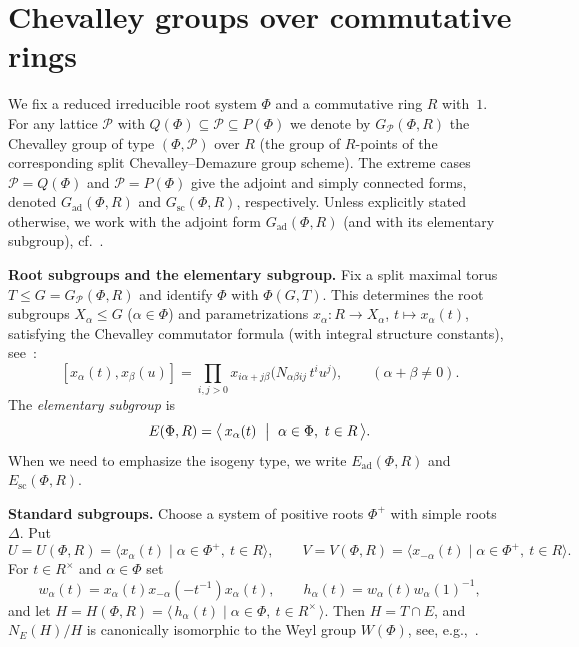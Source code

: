 \documentclass[]{jgcc}
\numberwithin{equation}{section}
\begin{document}
\bigskip

\section{Chevalley groups over commutative rings}\leavevmode\label{sec:Chev}

We fix a reduced irreducible root system $\Phi$ and a commutative ring $R$ with~$1$.
For any lattice $\mathcal P$ with $Q(\Phi)\subseteq \mathcal P \subseteq P(\Phi)$ we denote by
$G_{\mathcal P}(\Phi,R)$ the Chevalley group of type $(\Phi,\mathcal P)$ over $R$
(the group of $R$-points of the corresponding split Chevalley--Demazure group scheme).
The extreme cases $\mathcal P=Q(\Phi)$ and $\mathcal P=P(\Phi)$ give the adjoint and simply connected
forms, denoted $G_{\mathrm{ad}}(\Phi,R)$ and $G_{\mathrm{sc}}(\Phi,R)$, respectively.
Unless explicitly stated otherwise, we work with the adjoint form $G_{\mathrm{ad}}(\Phi,R)$
(and with its elementary subgroup), cf.~\cite{Carter,Steinberg}.

\medskip
\noindent\textbf{Root subgroups and the elementary subgroup.}
Fix a split maximal torus $T\le G=G_{\mathcal P}(\Phi,R)$ and identify $\Phi$ with $\Phi(G,T)$.
This determines the root subgroups $X_\alpha\le G$ ($\alpha\in\Phi$) and parametrizations
$x_\alpha\colon R\to X_\alpha$, $t\mapsto x_\alpha(t)$, satisfying the Chevalley commutator formula
(with integral structure constants), see~\cite{Carter,Steinberg}:
\begin{equation}\label{eq:Chev-comm}
[x_\alpha(t),x_\beta(u)]
=\prod_{i,j>0} x_{i\alpha+j\beta}\!\bigl(N_{\alpha\beta ij}\,t^i u^j\bigr),
\qquad (\alpha+\beta\neq 0).
\end{equation}
The \emph{elementary subgroup} is
\[
E(\Phi,R)=\bigl\langle\,x_\alpha(t)\ \bigm|\ \alpha\in\Phi,\ t\in R\,\bigr\rangle.
\]
When we need to emphasize the isogeny type, we write $E_{\mathrm{ad}}(\Phi,R)$ and $E_{\mathrm{sc}}(\Phi,R)$.

\medskip
\noindent\textbf{Standard subgroups.}
Choose a system of positive roots $\Phi^+$ with simple roots $\Delta$.
Put
\[
U=U(\Phi,R)=\langle x_\alpha(t)\mid \alpha\in\Phi^+,\ t\in R\rangle,\qquad
V=V(\Phi,R)=\langle x_{-\alpha}(t)\mid \alpha\in\Phi^+,\ t\in R\rangle.
\]
For $t\in R^\times$ and $\alpha\in\Phi$ set
\[
w_\alpha(t)=x_\alpha(t)x_{-\alpha}(-t^{-1})x_\alpha(t),\qquad
h_\alpha(t)=w_\alpha(t)w_\alpha(1)^{-1},
\]
and let $H=H(\Phi,R)=\langle\,h_\alpha(t)\mid \alpha\in\Phi,\ t\in R^\times\,\rangle$.
Then $H=T\cap E$, and $N_E(H)/H$ is canonically isomorphic to the Weyl group $W(\Phi)$,
see, e.g.,~\cite{Steinberg,Carter}.
\end{document}
